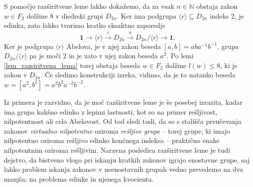 \begin{primer}\label{prm_razsiritvena}
    S pomočjo razširitvene leme lakho dokažemo, da za vsak $n \in \mathbb{N}$ obstaja zakon $w \in F_2$ dolžine $8$ v diedrski grupi $D_{2n}$. Ker ima podgrupa $\langle r \rangle \subseteq D_{2n}$ indeks 2, je edinka,
    zato lahko tvorimo kratko eksaktno zaporedje \begin{equation*}
        \mathbf{1} \to \langle r \rangle  \xrightarrow{i} D_{2n} \xrightarrow{\pi} D_{2n} / \langle r \rangle  \to \mathbf{1}.
        \end{equation*}
        Ker je podgrupa $\langle r \rangle$ Abelova, je v njej zakon beseda $[a, b] = aba^{-1} b^{-1}$, grupa $D_{2n} / \langle r \rangle$ pa je moči $2$ in je zato v njej zakon beseda $a^2$. Po lemi \ref{lem_razsiritvena_lema} torej obstaja beseda $w \in F_2$ dolžine $l(w) \le  8$, ki je zakon v $D_{2n}$.
        Če sledimo konstrukciji izreka, vidimo, da je to natanko beseda $w = [a^2, b^2] = a^2 b^2 a^{-2} b^{-2}$.   
\end{primer}

Iz primera je razvidno, da je moč razširitvene leme je še posebej izrazita, kadar ima grupa kakšno edinko z lepimi lastnosti, kot so na primer rešljivost, nilpotentnost ali celo Abelovost. Od tod sledi tudi, da so s stališča preučevanja zakonov \emph{virtualno nilpotentne} oziroma \emph{rešljive grupe} -- torej grupe, ki imajo nilpotentno oziroma rešljivo edinko končnega indeksa --
praktično enake nilpotentnim oziroma rešljivim. Naravna posledica razširitvene leme je tudi dejstvo, da bistveno vlogo pri iskanju kratkih zakonov igrajo enostavne grupe, saj lahko problem iskanja zakonov v neenostavnih grupah vedno prevedemo na dva manjša; na problema edinke in njenega kvocienta.  
